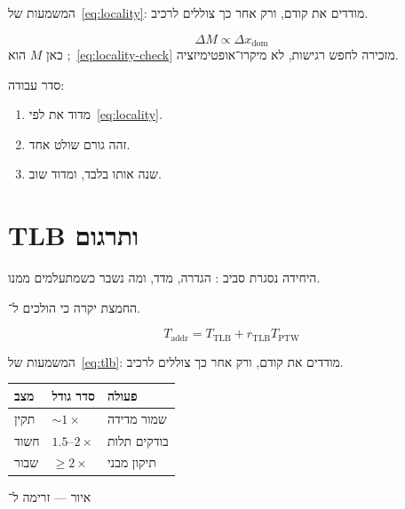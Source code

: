 המשמעות של~\eqref{eq:locality}: מודדים את  קודם, ורק אחר כך צוללים לרכיב.

\begin{equation}
\label{eq:locality-check}
\Delta M \propto \Delta x_{\mathrm{dom}}
\end{equation}
כאן $M$ הוא ;~\eqref{eq:locality-check} מזכירה לחפש רגישות, לא מיקרו־אופטימיזציה.

סדר עבודה:
\begin{enumerate}
\item[(\textbf{א})] מדוד את  לפי~\eqref{eq:locality}.
\item[(\textbf{ב})] זהה גורם שולט אחד.
\item[(\textbf{ג})] שנה אותו בלבד, ומדוד שוב.
\end{enumerate}

\chapter{TLB ותרגום}
\label{ch:tlb}

היחידה נסגרת סביב : הגדרה, מדד, ומה נשבר כשמתעלמים ממנו.

\begin{keybox}[frametitle={רעיון מפתח — TLB ותרגום}]
החמצת  יקרה כי הולכים ל־.
\end{keybox}

\begin{equation}
\label{eq:tlb}
T_{\mathrm{addr}}=T_{\mathrm{TLB}}+r_{\mathrm{TLB}}T_{\mathrm{PTW}}
\end{equation}

המשמעות של~\eqref{eq:tlb}: מודדים את  קודם, ורק אחר כך צוללים לרכיב.

\begin{tablebox}\centering\small
\begin{tabular}{@{}lll@{}}
\toprule
\textbf{מצב} & \textbf{סדר גודל} & \textbf{פעולה}\\
\midrule
תקין & $\sim 1\times$ & שמור מדידה\\
חשוד & $1.5$–$2\times$ & בודקים תלות\\
שבור & $\ge 2\times$ & תיקון מבני\\
\bottomrule
\end{tabular}
\end{tablebox}

\begin{tikzpic}
\end{tikzpic}
\begin{center}\small איור — זרימה ל־\end{center}

